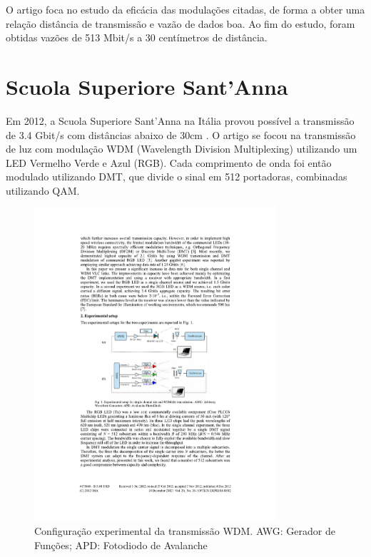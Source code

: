 	O artigo foca no estudo da eficácia das modulações citadas, de forma a obter uma relação distância de transmissão e vazão de dados boa. Ao fim do estudo, foram obtidas vazões de 513 Mbit/s a 30 centímetros de distância. 

	\section{Scuola Superiore Sant’Anna}
	
	Em 2012, a Scuola Superiore Sant’Anna na Itália provou possível a transmissão de 3.4 Gbit/s com distâncias abaixo de 30cm \cite{3.4g-sant-ana}. O artigo se focou na transmissão de luz com modulação WDM (Wavelength Division Multiplexing) utilizando um LED Vermelho Verde e Azul (RGB). Cada comprimento de onda foi então modulado utilizando DMT, que divide o sinal em 512 portadoras, combinadas utilizando QAM.
	
	\begin{figure}[h]
		\caption{\label{figure:santanna-architecture}Configuração experimental da transmissão WDM. AWG: Gerador de Funções; APD: Fotodiodo de Avalanche}
		\centering
		\includegraphics[width=0.8\textwidth, trim={6.6cm 11cm 5cm 13.5cm},clip]{sant-ana.pdf}
	\end{figure}
	
